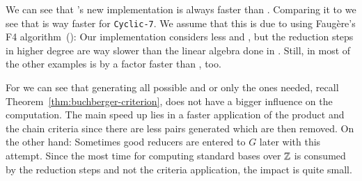 We can see that \singular's new implementation is always faster than \macaulay.
Comparing it to \magma we see that \magma is way faster for \texttt{Cyclic-7}.
We assume that this is due to \magma using Faug\`ere's F4
algorithm~(\cite{fF41999}): Our implementation considers less \spts and \gpts, but
the reduction steps in higher degree are way slower than the linear algebra done
in \magma. Still, in most of the other examples \singular is by a
factor faster than \magma, too.

For \singular we can see that generating all possible \spts and \gpts or only
the ones needed, recall Theorem~\ref{thm:buchberger-criterion}, does not have a
bigger influence on the computation. The main speed up lies in a faster
application of the product and the chain criteria since there are less pairs
generated which are then removed. On the other hand: Sometimes good reducers
are entered to $G$ later with this attempt. Since the most time for computing
standard bases over $\mathbb{Z}$ is consumed by the reduction steps and not the
criteria application, the impact is quite small.
